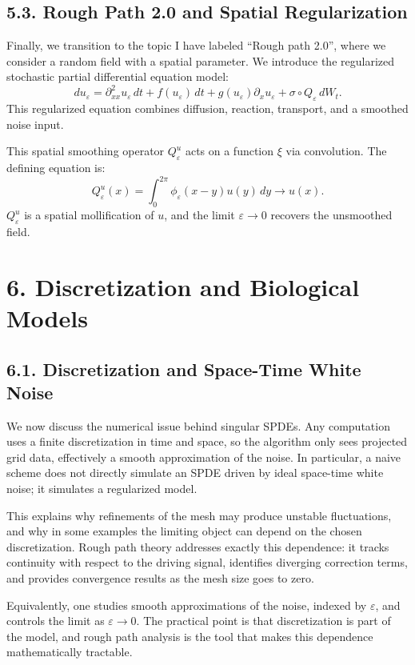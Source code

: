 \documentclass[11pt]{article}
\theoremstyle{definition}
\theoremstyle{remark}
\begin{document}
\subsection*{5.3. Rough Path 2.0 and Spatial Regularization}
Finally, we transition to the topic I have labeled ``Rough path 2.0'', where we consider a random field with a spatial parameter. We introduce the regularized stochastic partial differential equation model:
\[
du_{\varepsilon}
=\partial_{xx}^2u_{\varepsilon}\,dt+f(u_{\varepsilon})\,dt+g(u_{\varepsilon})\partial_xu_{\varepsilon}+\sigma\circ Q_{\varepsilon}\,dW_t.
\]
This regularized equation combines diffusion, reaction, transport, and a smoothed noise input.

This spatial smoothing operator $Q_{\varepsilon}^u$ acts on a function $\xi$ via convolution. The defining equation is:
\[
Q_{\varepsilon}^u(x)=\int_0^{2\pi}\phi_{\varepsilon}(x-y)u(y)\,dy\to u(x).
\]
$Q_{\varepsilon}^u$ is a spatial mollification of $u$, and the limit $\varepsilon\to0$ recovers the unsmoothed field.


\section*{6. Discretization and Biological Models}
\subsection*{6.1. Discretization and Space-Time White Noise}
We now discuss the numerical issue behind singular SPDEs. Any computation uses a finite discretization in time and space, so the algorithm only sees projected grid data, effectively a smooth approximation of the noise. In particular, a naive scheme does not directly simulate an SPDE driven by ideal space-time white noise; it simulates a regularized model.

This explains why refinements of the mesh may produce unstable fluctuations, and why in some examples the limiting object can depend on the chosen discretization. Rough path theory addresses exactly this dependence: it tracks continuity with respect to the driving signal, identifies diverging correction terms, and provides convergence results as the mesh size goes to zero.

Equivalently, one studies smooth approximations of the noise, indexed by $\varepsilon$, and controls the limit as $\varepsilon\to 0$. The practical point is that discretization is part of the model, and rough path analysis is the tool that makes this dependence mathematically tractable.
\end{document}
